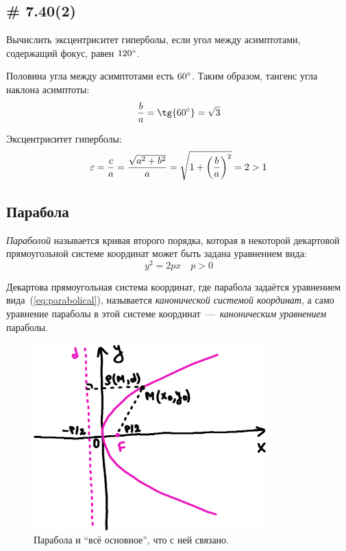 \documentclass[a4paper,12pt]{article}
\begin{document}
  
  \subsection{\# 7.40(2)}
  
  Вычислить эксцентриситет гиперболы, если угол между асимптотами, содержащий фокус, равен $120\degree$.
  
  \begin{solution}
    Половина угла между асимптотами есть $60\degree$.
    Таким образом, тангенс угла наклона асимптоты:
    \[
      \frac{b}{a} = \tg{60\degree} = \sqrt{3}
    \]
    
    Эксцентриситет гиперболы:
    \[
      \varepsilon = \frac{c}{a} = \frac{\sqrt{a^2 + b^2}}{a}
      = \sqrt{1 + \left(\frac{b}{a}\right)^2}
      = 2 > 1
    \]
  \end{solution}
  
  
  \subsection{Парабола}
  
  \begin{definition}
    \emph{Параболой} называется кривая второго порядка, которая в некоторой декартовой прямоугольной системе координат может быть задана уравнением вида:
    \begin{equation}\label{eq:parabolical}
      \boxed{y^2 = 2px}\quad p > 0
    \end{equation}
    
    Декартова прямоугольная система координат, где парабола задаётся уравнением вида~(\ref{eq:parabolical}), называется \emph{канонической системой координат}, а само уравнение параболы в этой системе координат~---~\emph{каноническим уравнением} параболы.
  \end{definition}
  
  \begin{figure}[h]
    \centering
    
    \includegraphics[width=0.8\textwidth]{parabola}
    
    \caption{Парабола и ``всё основное'', что с ней связано.}
    \label{fig:parabola}
  \end{figure}
  
\end{document}
